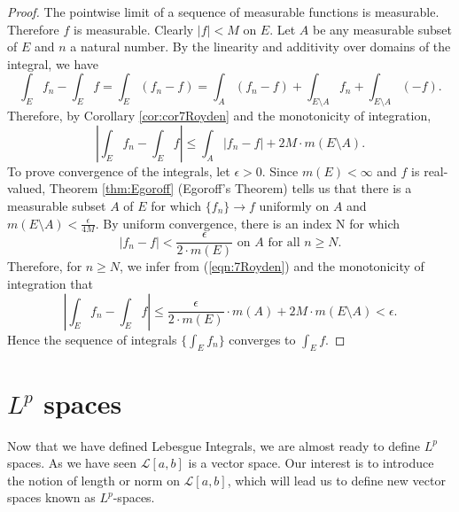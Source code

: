 \documentclass[12pt]{amsart}
\theoremstyle{plain}
\theoremstyle{definition}
\theoremstyle{remark}
\numberwithin{equation}{section}
\numberwithin{thm}{section}
\begin{document}
\begin{proof}
The pointwise limit of a sequence of measurable functions is measurable. Therefore $f$ is measurable. Clearly $|f|<M$ on $E$. Let $A$ be any measurable subset of $E$ and $n$ a natural number. By the linearity and additivity over domains of the integral, we have
\begin{equation*}
    \int_E f_n - \int_E f = \int_E (f_n -f) = \int_A (f_n-f) + \int_{E \setminus A} f_n + \int_{E \setminus A} (-f).
\end{equation*}
Therefore, by Corollary \ref{cor:cor7Royden} and the monotonicity of integration,
\begin{equation} \label{eqn:7Royden}
    |\int_E f_n - \int_E f | \leq \int_A |f_n-f| + 2M \cdot m(E \setminus A).
\end{equation}
To prove convergence of the integrals, let $\epsilon>0$. Since $m(E)<\infty$ and $f$ is real-valued, Theorem \ref{thm:Egoroff} (Egoroff's Theorem) tells us that there is a measurable subset $A$ of $E$ for which $\{ f_n \} \to f$ uniformly on $A$ and $m(E \setminus A) < \frac{\epsilon}{4M}$. By uniform convergence, there is an index N for which
\begin{equation*}
    |f_n -f | < \frac{\epsilon}{2 \cdot m(E)} \text{ on } A \text{ for all } n \geq N.
\end{equation*}
Therefore, for $n \geq N$, we infer from (\ref{eqn:7Royden}) and the monotonicity of integration that
\begin{equation*}
    |\int_E f_n - \int_E f| \leq \frac{\epsilon}{2 \cdot m(E)}\cdot m(A) + 2M \cdot m(E \setminus A) < \epsilon.
\end{equation*}
Hence the sequence of integrals $\{ \int_E f_n \}$ converges to $\int_E f$.
\end{proof}
\section{\textbf{$L^p$ spaces}}\label{sec:LpSpace}
Now that we have defined Lebesgue Integrals, we are almost ready to define $L^p$ spaces. As we have seen $\mathcal{L}[a,b]$ is a vector space. Our interest is to introduce the notion of length or norm on $\mathcal{L}[a,b]$, which will lead us to define new vector spaces known as $L^p$-spaces.  
\end{document}
